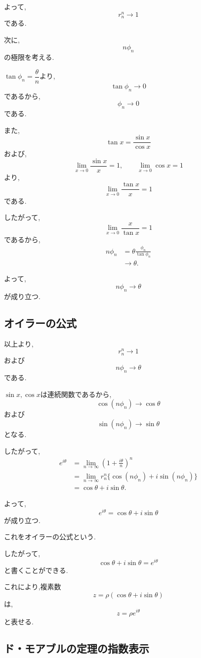   よって,
  \[
    r_n^n\to1
  \]
  である.

  次に,
  \[
    n\phi_n
  \]
  の極限を考える.

  $\tan\phi_n=\dfrac{\theta}{n}$より,
  \[
    \tan\phi_n\to0
  \]
  であるから,
  \[
    \phi_n\to0
  \]
  である.

  また,
  \[
    \tan x
    =
    \frac{\sin x}{\cos x}
  \]
  および,
  \[
    \lim_{x\to0}\frac{\sin x}{x}=1,
    \qquad
    \lim_{x\to0}\cos x=1
  \]
  より,
  \[
    \lim_{x\to0}\frac{\tan x}{x}=1
  \]
  である.

  したがって,
  \[
    \lim_{x\to0}\frac{x}{\tan x}=1
  \]
  であるから,
  \begin{align*}
    n\phi_n
    &=
    \theta
    \frac{\phi_n}{\tan\phi_n}\\
    &\to
    \theta.
  \end{align*}

  よって,
  \[
    n\phi_n\to\theta
  \]
  が成り立つ.


\subsection{オイラーの公式}

  以上より,
  \[
    r_n^n\to1
  \]
  および
  \[
    n\phi_n\to\theta
  \]
  である.

  $\sin x,\cos x$は連続関数であるから,
  \[
    \cos(n\phi_n)\to\cos\theta
  \]
  および
  \[
    \sin(n\phi_n)\to\sin\theta
  \]
  となる.

  したがって,
  \begin{align*}
    e^{i\theta}
    &=
    \lim_{n\to\infty}
    \left(
      1+\frac{i\theta}{n}
    \right)^n\\
    &=
    \lim_{n\to\infty}
    r_n^n
    \{
      \cos(n\phi_n)
      +i\sin(n\phi_n)
    \}\\
    &=
    \cos\theta+i\sin\theta.
  \end{align*}

  よって,
  \[
    e^{i\theta}
    =
    \cos\theta+i\sin\theta
  \]
  が成り立つ.

  これをオイラーの公式という.

  したがって,
  \[
    \cos\theta+i\sin\theta
    =
    e^{i\theta}
  \]
  と書くことができる.

  これにより,複素数
  \[
    z
    =
    \rho(
      \cos\theta+i\sin\theta
    )
  \]
  は,
  \[
    z
    =
    \rho e^{i\theta}
  \]
  と表せる.


\subsection{ド・モアブルの定理の指数表示}

